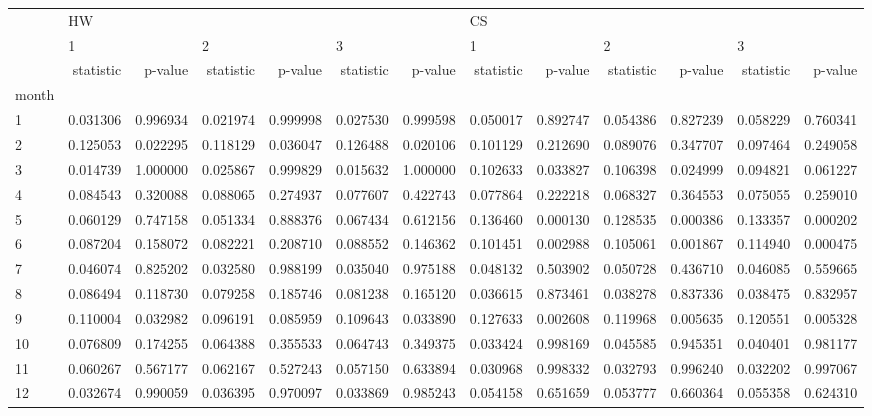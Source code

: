 \begin{tabular}{lrrrrrrrrrrrr}
\toprule
{} & \multicolumn{6}{l}{HW} & \multicolumn{6}{l}{CS} \\
{} & \multicolumn{2}{l}{1} & \multicolumn{2}{l}{2} & \multicolumn{2}{l}{3} & \multicolumn{2}{l}{1} & \multicolumn{2}{l}{2} & \multicolumn{2}{l}{3} \\
{} & statistic &   p-value & statistic &   p-value & statistic &   p-value & statistic &   p-value & statistic &   p-value & statistic &   p-value \\
month &           &           &           &           &           &           &           &           &           &           &           &           \\
\midrule
1     &  0.031306 &  0.996934 &  0.021974 &  0.999998 &  0.027530 &  0.999598 &  0.050017 &  0.892747 &  0.054386 &  0.827239 &  0.058229 &  0.760341 \\
2     &  0.125053 &  0.022295 &  0.118129 &  0.036047 &  0.126488 &  0.020106 &  0.101129 &  0.212690 &  0.089076 &  0.347707 &  0.097464 &  0.249058 \\
3     &  0.014739 &  1.000000 &  0.025867 &  0.999829 &  0.015632 &  1.000000 &  0.102633 &  0.033827 &  0.106398 &  0.024999 &  0.094821 &  0.061227 \\
4     &  0.084543 &  0.320088 &  0.088065 &  0.274937 &  0.077607 &  0.422743 &  0.077864 &  0.222218 &  0.068327 &  0.364553 &  0.075055 &  0.259010 \\
5     &  0.060129 &  0.747158 &  0.051334 &  0.888376 &  0.067434 &  0.612156 &  0.136460 &  0.000130 &  0.128535 &  0.000386 &  0.133357 &  0.000202 \\
6     &  0.087204 &  0.158072 &  0.082221 &  0.208710 &  0.088552 &  0.146362 &  0.101451 &  0.002988 &  0.105061 &  0.001867 &  0.114940 &  0.000475 \\
7     &  0.046074 &  0.825202 &  0.032580 &  0.988199 &  0.035040 &  0.975188 &  0.048132 &  0.503902 &  0.050728 &  0.436710 &  0.046085 &  0.559665 \\
8     &  0.086494 &  0.118730 &  0.079258 &  0.185746 &  0.081238 &  0.165120 &  0.036615 &  0.873461 &  0.038278 &  0.837336 &  0.038475 &  0.832957 \\
9     &  0.110004 &  0.032982 &  0.096191 &  0.085959 &  0.109643 &  0.033890 &  0.127633 &  0.002608 &  0.119968 &  0.005635 &  0.120551 &  0.005328 \\
10    &  0.076809 &  0.174255 &  0.064388 &  0.355533 &  0.064743 &  0.349375 &  0.033424 &  0.998169 &  0.045585 &  0.945351 &  0.040401 &  0.981177 \\
11    &  0.060267 &  0.567177 &  0.062167 &  0.527243 &  0.057150 &  0.633894 &  0.030968 &  0.998332 &  0.032793 &  0.996240 &  0.032202 &  0.997067 \\
12    &  0.032674 &  0.990059 &  0.036395 &  0.970097 &  0.033869 &  0.985243 &  0.054158 &  0.651659 &  0.053777 &  0.660364 &  0.055358 &  0.624310 \\
\bottomrule
\end{tabular}
